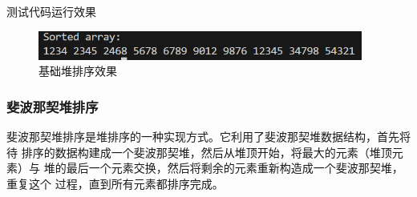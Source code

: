 \documentclass[UTF8]{ctexart}
\begin{document}
测试代码运行效果
\begin{figure}[H]
    \centering
    \includegraphics[width=0.95\textwidth]{picture/Screenshot 2024-10-20 162055.png}
    \caption{基础堆排序效果}
\end{figure}

\subsubsection{斐波那契堆排序}
斐波那契堆排序是堆排序的一种实现方式。它利用了斐波那契堆数据结构，首先将待
排序的数据构建成一个斐波那契堆，然后从堆顶开始，将最大的元素（堆顶元素）与
堆的最后一个元素交换，然后将剩余的元素重新构造成一个斐波那契堆，重复这个
过程，直到所有元素都排序完成。
\end{document}
